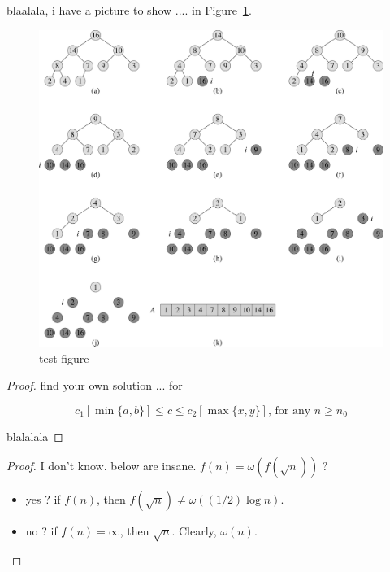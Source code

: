 \documentclass[11pt]{article}
\begin{document}
blaalala, i have a picture to show .... in Figure~\ref{fig:test}.

\begin{figure}[h!]
\begin{center}
\includegraphics[scale=0.1]{Fig-6-4.pdf}
\caption{test figure}
\label{fig:test}
\end{center}
\end{figure}

\bigskip


\begin{proof}
find your own solution ... for 
 
$$c_1[\min\{a,b\}]\leq c \leq c_2[\max\{x,y\}] 
\textrm{, for any }
n\geq n_0$$

blalalala

\end{proof}

\bigskip


\begin{proof}
I don't know. below are insane. 
$f(n)=\omega(f(\sqrt{n}))$ ?

\begin{itemize}
\item
yes ?  if $f(n)$, then
$f(\sqrt{n})\neq \omega((1/2)\log n)$. 
\item
no ?  if $f(n)=\infty$, then
$\sqrt{n}$. Clearly, 
$\omega(n)$.
\end{itemize}
\end{proof}
\end{document}
